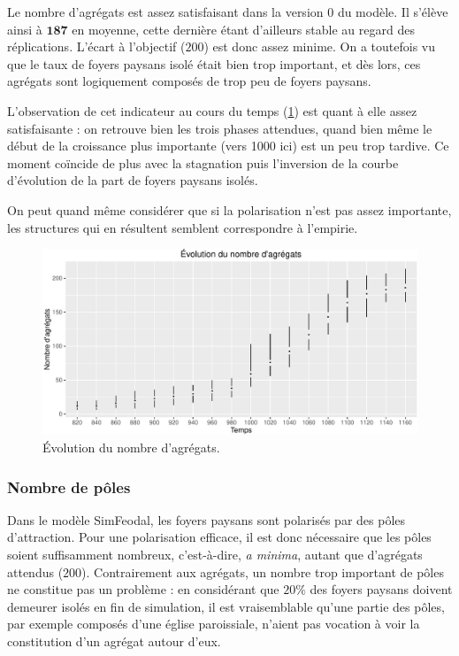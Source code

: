 \begin{mdframed}[backgroundcolor=gray!10,footnoteinside=false]
Le nombre d'agrégats est assez satisfaisant dans la version 0 du modèle.
Il s'élève ainsi à $\textbf{187}$ en moyenne, cette dernière étant d'ailleurs stable au regard des réplications.
L'écart à l'objectif ($200$) est donc assez minime.
On a toutefois vu que le taux de foyers paysans isolé était bien trop important, et dès lors, ces agrégats sont logiquement composés de trop peu de foyers paysans.

L'observation de cet indicateur au cours du temps (\cref{fig:nombre-agregats-v0}) est quant à elle assez satisfaisante :
on retrouve bien les trois phases attendues, quand bien même le début de la croissance plus importante (vers 1000 ici) est un peu trop tardive.
Ce moment coïncide de plus avec la stagnation puis l'inversion de la courbe d'évolution de la part de foyers paysans isolés.

On peut quand même considérer que si la polarisation n'est pas assez importante, les structures qui en résultent semblent correspondre à l'empirie.
\end{mdframed}

\begin{figure}[H]
\captionsetup{width=\linewidth}
\includegraphics[width=0.5\linewidth]{img/resultats/v0_nombre_agregats.pdf}
\caption{Évolution du nombre d'agrégats.}
\label{fig:nombre-agregats-v0}
\end{figure}


\clearpage

\subsubsection{Nombre de pôles}\label{par:nb-poles}

Dans le modèle SimFeodal, les foyers paysans sont polarisés par des pôles d'attraction.
Pour une polarisation efficace, il est donc nécessaire que les pôles soient suffisamment nombreux, c'est-à-dire, \textit{a minima}, autant que d'agrégats attendus ($200$).
Contrairement aux agrégats, un nombre trop important de pôles ne constitue pas un problème :
en considérant que $20\%$ des foyers paysans doivent demeurer isolés en fin de simulation, il est vraisemblable qu'une partie des pôles, par exemple composés d'une église paroissiale, n'aient pas vocation à voir la constitution d'un agrégat autour d'eux.

